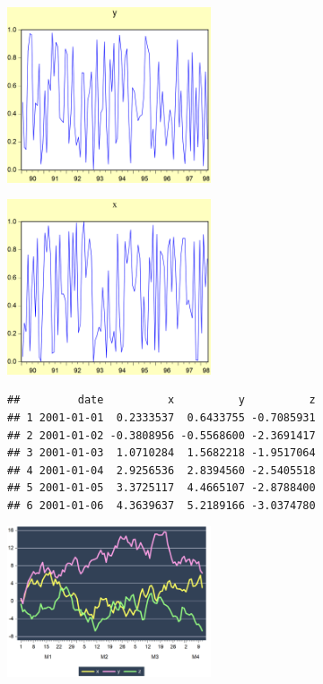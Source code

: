 \documentclass[
]{article}
\begin{document}
\begin{center}\includegraphics[width=0.45\textwidth]{test_engEviews_files/figure-latex//eview-graph-y} \end{center}

\begin{center}\includegraphics[width=0.45\textwidth]{test_engEviews_files/figure-latex//eview-graph-x} \end{center}

\begin{verbatim}
##         date          x          y          z
## 1 2001-01-01  0.2333537  0.6433755 -0.7085931
## 2 2001-01-02 -0.3808956 -0.5568600 -2.3691417
## 3 2001-01-03  1.0710284  1.5682218 -1.9517064
## 4 2001-01-04  2.9256536  2.8394560 -2.5405518
## 5 2001-01-05  3.3725117  4.4665107 -2.8788400
## 6 2001-01-06  4.3639637  5.2189166 -3.0374780
\end{verbatim}

\begin{center}\includegraphics[width=0.45\textwidth]{test_engEviews_files/figure-latex//rwalk-xyz} \end{center}
\end{document}
